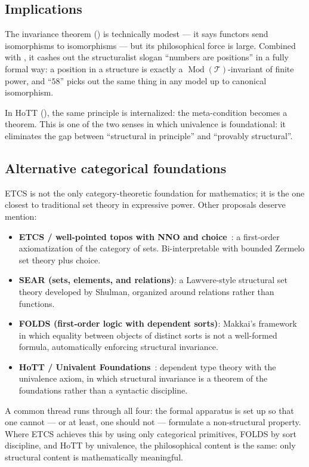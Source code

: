 \documentclass[12pt]{article}
\theoremstyle{definition}
\theoremstyle{remark}
\newcommand{\T}{\mathcal{T}}
\newcommand{\Mod}[1]{\operatorname{Mod}(#1)}
\begin{document}
\subsection{Implications}

The invariance theorem () is technically modest --- it says functors send isomorphisms to isomorphisms --- but its philosophical force is large. Combined with , it cashes out the structuralist slogan ``numbers are positions'' in a fully formal way: a position in a structure is exactly a $\Mod{\T}$-invariant of finite power, and ``$58$'' picks out the same thing in any model up to canonical isomorphism.

In HoTT (), the same principle is internalized: the meta-condition becomes a theorem. This is one of the two senses in which univalence is foundational: it eliminates the gap between ``structural in principle'' and ``provably structural''.

\subsection{Alternative categorical foundations}

ETCS is not the only category-theoretic foundation for mathematics; it is the one closest to traditional set theory in expressive power. Other proposals deserve mention:

\begin{itemize}
  \item \textbf{ETCS / well-pointed topos with NNO and choice}~\cite{Lawvere1964}: a first-order axiomatization of the category of sets. Bi-interpretable with bounded Zermelo set theory plus choice.
  \item \textbf{SEAR (sets, elements, and relations)}: a Lawvere-style structural set theory developed by Shulman, organized around relations rather than functions.
  \item \textbf{FOLDS (first-order logic with dependent sorts)}: Makkai's framework in which equality between objects of distinct sorts is not a well-formed formula, automatically enforcing structural invariance.
  \item \textbf{HoTT / Univalent Foundations}~\cite{HoTTBook}: dependent type theory with the univalence axiom, in which structural invariance is a theorem of the foundations rather than a syntactic discipline.
\end{itemize}

A common thread runs through all four: the formal apparatus is set up so that one cannot --- or at least, one should not --- formulate a non-structural property. Where ETCS achieves this by using only categorical primitives, FOLDS by sort discipline, and HoTT by univalence, the philosophical content is the same: only structural content is mathematically meaningful.
\end{document}
